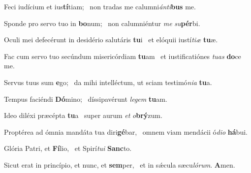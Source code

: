 \item Feci iudícium et ius\textbf{tí}tiam;~\psstar{} non tradas me calumni\textit{ánti}\textbf{bus} me.

\item Sponde pro servo tuo in \textbf{bo}num;~\psstar{} non calumniéntur \textit{me} \textit{su}\textbf{pér}bi.

\item Oculi mei defecérunt in desidério salutáris \textbf{tu}i~\psstar{} et elóquii iustí\textit{tiæ} \textbf{tu}æ.

\item Fac cum servo tuo secúndum misericórdiam \textbf{tu}am~\psstar{} et iustificatiónes \textit{tuas} \textbf{do}ce me.

\item Servus tuus sum \textbf{e}go;~\psstar{} da mihi intelléctum, ut sciam testimó\textit{nia} \textbf{tu}a.

\item Tempus faciéndi \textbf{Dó}mino;~\psstar{} díssipavérunt \textit{legem} \textbf{tu}am.

\item Ideo diléxi præcépta \textbf{tu}a~\psstar{} super aurum \textit{et} \textit{o}\textbf{brý}zum.

\item Proptérea ad ómnia mandáta tua diri\textbf{gé}bar,~\psstar{} omnem viam mendácii ó\textit{dio} \textbf{há}bui.

\item Glória Patri, et \textbf{Fí}lio,~\psstar{} et Spirí\textit{tui} \textbf{Sanc}to.

\item Sicut erat in princípio, et nunc, et \textbf{sem}per,~\psstar{} et in sǽcula sæcu\textit{lórum}. \textbf{A}men.